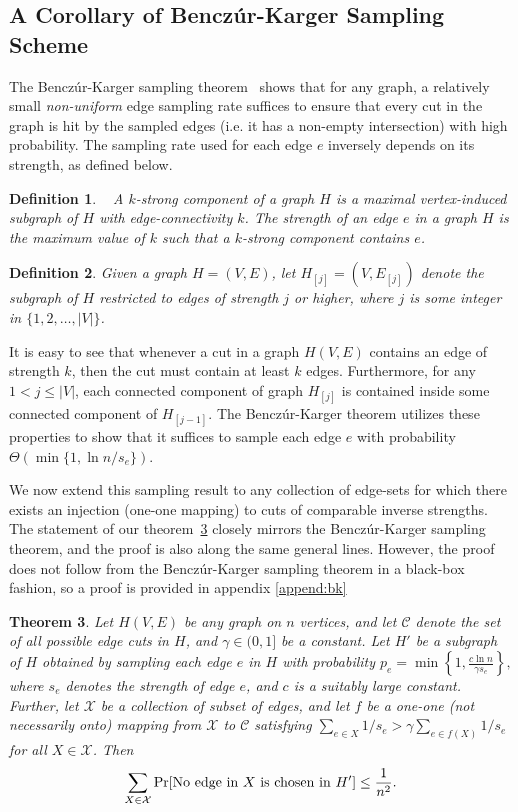 \documentclass[11pt]{article}
\newtheorem{theorem}{Theorem}[section]
\newtheorem{definition}[theorem]{Definition}
\newcommand{\edgesets}{\mathcal X}
\begin{document}
\subsection{A Corollary of Bencz\'{u}r-Karger Sampling Scheme}

The Bencz\'{u}r-Karger sampling theorem~\cite{benczurkarger96} shows that for any
graph, a relatively small {\em non-uniform} edge sampling rate suffices to
ensure that every cut in the graph is hit by the sampled edges (i.e. it has a non-empty intersection)
with high probability. The sampling rate used for each edge $e$ inversely
depends on its strength, as defined below.

\label{sec:benczur-karger}
\begin{definition}~\cite{benczurkarger96} A $k$-strong component of a graph
  $H$ is a maximal vertex-induced subgraph of $H$ with edge-connectivity $k$.  The
  strength of an edge $e$ in a graph $H$ is the maximum value of $k$ such that
  a $k$-strong component contains $e$.
\end{definition}
\begin{definition}
  Given a graph $H=(V,E)$, let $H_{[j]} = (V,E_{[j]})$ denote the subgraph of $H$
  restricted to edges of strength $j$ or higher, where $j$ is some integer in
  $\{1, 2, \ldots, |V|\}$.
\end{definition}

It is easy to see that whenever a cut in a graph $H(V,E)$ contains an edge of strength $k$,
then the cut must contain at least $k$ edges. Furthermore, for any $1 < j \le |V|$, each connected
component of graph $H_{[j]}$ is contained inside some connected component of $H_{[j-1]}$.
The Bencz\'{u}r-Karger theorem utilizes these properties to show that it suffices to sample
each edge $e$ with probability $\Theta( \min\{ 1, \ln n / s_e \})$.

We now extend this sampling result to any collection of edge-sets for which there exists an injection
(one-one mapping) to cuts of comparable inverse strengths. The statement
of our theorem~\ref{thm:Benczur-Karger} closely mirrors the Bencz\'{u}r-Karger
sampling theorem, and the proof is also along the same general lines. However, the proof does not follow from the Bencz\'{u}r-Karger sampling theorem in a black-box fashion, so a proof is provided in appendix \ref{append:bk}
\begin{theorem}
\label{thm:Benczur-Karger}
Let $H(V,E)$ be any graph on $n$ vertices, and let ${\mathcal C}$ denote the set
of all possible edge cuts in $H$, and $\gamma \in (0,1]$ be a constant. Let
$H'$ be a subgraph of $H$ obtained by sampling each edge $e$ in $H$ with
probability
$ p_e = \min\left\{ 1, \frac{c \ln n}{\gamma s_e} \right\},$
where $s_e$ denotes the strength of edge $e$, and $c$ is a suitably large
constant. Further, let $\edgesets$ be a collection of subset of edges, and let $f$
be a one-one (not necessarily onto) mapping from $\edgesets$ to $\mathcal C$
satisfying $\sum_{e\in X} 1/s_e > \gamma\sum_{e\in f(X)} 1/s_e$ for all $X\in
\edgesets$. Then
$$ \sum_{ X \in \edgesets }  \Pr[ {\rm No~edge~in~}X~{\rm is~chosen~in~}H']
\leq
\frac{1}{n^2}.$$
\end{theorem}
\end{document}
